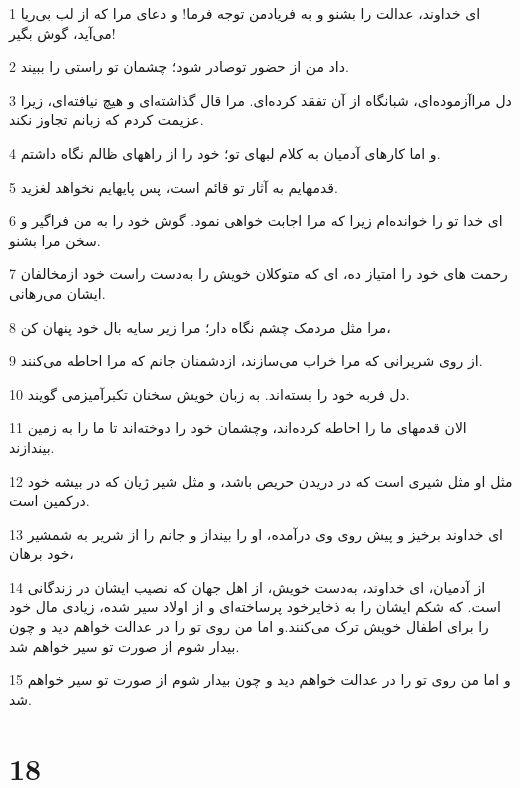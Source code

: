 \par 1 ای خداوند، عدالت را بشنو و به فریادمن توجه فرما! و دعای مرا که از لب بی‌ریا می‌آید، گوش بگیر!
\par 2 داد من از حضور توصادر شود؛ چشمان تو راستی را ببیند.
\par 3 دل مراآزموده‌ای، شبانگاه از آن تفقد کرده‌ای. مرا قال گذاشته‌ای و هیچ نیافته‌ای، زیرا عزیمت کردم که زبانم تجاوز نکند.
\par 4 و اما کارهای آدمیان به کلام لبهای تو؛ خود را از راههای ظالم نگاه داشتم.
\par 5 قدمهایم به آثار تو قائم است، پس پایهایم نخواهد لغزید.
\par 6 ‌ای خدا تو را خوانده‌ام زیرا که مرا اجابت خواهی نمود. گوش خود را به من فراگیر و سخن مرا بشنو.
\par 7 رحمت های خود را امتیاز ده، ای که متوکلان خویش را به‌دست راست خود ازمخالفان ایشان می‌رهانی.
\par 8 مرا مثل مردمک چشم نگاه دار؛ مرا زیر سایه بال خود پنهان کن،
\par 9 از روی شریرانی که مرا خراب می‌سازند، ازدشمنان جانم که مرا احاطه می‌کنند.
\par 10 دل فربه خود را بسته‌اند. به زبان خویش سخنان تکبرآمیزمی گویند.
\par 11 الان قدمهای ما را احاطه کرده‌اند، وچشمان خود را دوخته‌اند تا ما را به زمین بیندازند.
\par 12 مثل او مثل شیری است که در دریدن حریص باشد، و مثل شیر ژیان که در بیشه خود درکمین است.
\par 13 ‌ای خداوند برخیز و پیش روی وی درآمده، او را بینداز و جانم را از شریر به شمشیر خود برهان،
\par 14 از آدمیان، ای خداوند، به‌دست خویش، از اهل جهان که نصیب ایشان در زندگانی است. که شکم ایشان را به ذخایرخود پرساخته‌ای و از اولاد سیر شده، زیادی مال خود را برای اطفال خویش ترک می‌کنند.و اما من روی تو را در عدالت خواهم دید و چون بیدار شوم از صورت تو سیر خواهم شد.
\par 15 و اما من روی تو را در عدالت خواهم دید و چون بیدار شوم از صورت تو سیر خواهم شد.
 
\chapter{18}

